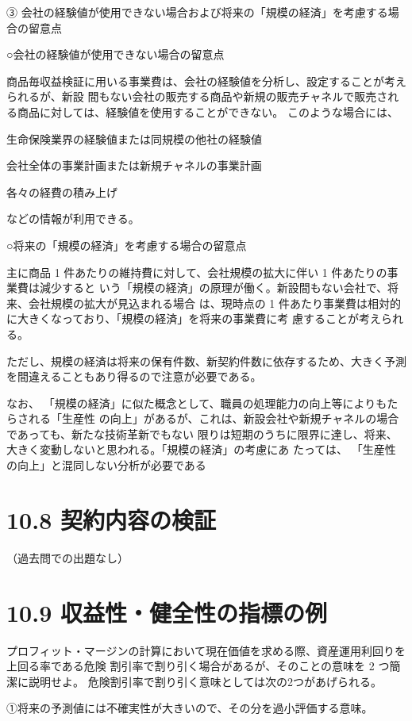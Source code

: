 \documentclass[report,gutter=10mm,fore-edge=10mm,uplatex,dvipdfmx]{jlreq}
\begin{document}
③ 会社の経験値が使用できない場合および将来の「規模の経済」を考慮する場合の留意点

○会社の経験値が使用できない場合の留意点

商品毎収益検証に用いる事業費は、会社の経験値を分析し、設定することが考えられるが、新設
間もない会社の販売する商品や新規の販売チャネルで販売される商品に対しては、経験値を使用することができない。
このような場合には、

生命保険業界の経験値または同規模の他社の経験値

会社全体の事業計画または新規チャネルの事業計画

各々の経費の積み上げ

などの情報が利用できる。

○将来の「規模の経済」を考慮する場合の留意点

主に商品 1 件あたりの維持費に対して、会社規模の拡大に伴い 1 件あたりの事業費は減少すると
いう「規模の経済」の原理が働く。新設間もない会社で、将来、会社規模の拡大が見込まれる場合
は、現時点の 1 件あたり事業費は相対的に大きくなっており、「規模の経済」を将来の事業費に考
慮することが考えられる。

ただし、規模の経済は将来の保有件数、新契約件数に依存するため、大きく予測を間違えることもあり得るので注意が必要である。

なお、
「規模の経済」に似た概念として、職員の処理能力の向上等によりもたらされる「生産性
の向上」があるが、これは、新設会社や新規チャネルの場合であっても、新たな技術革新でもない
限りは短期のうちに限界に達し、将来、大きく変動しないと思われる。「規模の経済」の考慮にあ
たっては、
「生産性の向上」と混同しない分析が必要である


\section{10.8 契約内容の検証}
（過去問での出題なし）
\section{10.9 収益性・健全性の指標の例}

プロフィット・マージンの計算において現在価値を求める際、資産運用利回りを上回る率である危険
割引率で割り引く場合があるが、そのことの意味を 2 つ簡潔に説明せよ。
\answer{}
危険割引率で割り引く意味としては次の2つがあげられる。

①将来の予測値には不確実性が大きいので、その分を過小評価する意味。
\end{document}
